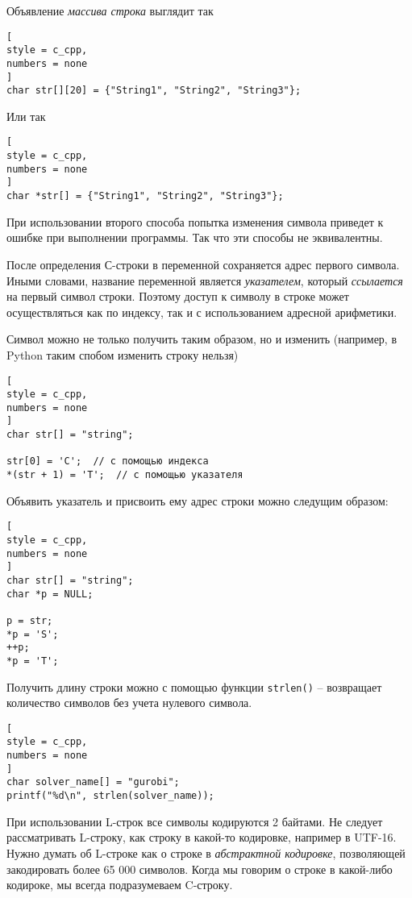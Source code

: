 \documentclass[%
	11pt,
	a4paper,
	utf8,
		]{article}
\begin{document}
Объявление \emph{массива строка} выглядит так
\begin{lstlisting}[
style = c_cpp,
numbers = none
]
char str[][20] = {"String1", "String2", "String3"};
\end{lstlisting}

Или так
\begin{lstlisting}[
style = c_cpp,
numbers = none
]
char *str[] = {"String1", "String2", "String3"};
\end{lstlisting}

При использовании второго способа попытка изменения символа приведет к ошибке при выполнении программы. Так что эти способы не эквивалентны.

После определения С-строки в переменной сохраняется адрес первого символа. Иными словами, название переменной является \emph{указателем}, который \emph{ссылается} на первый символ строки. Поэтому доступ к символу в строке может осуществляться как по индексу, так и с использованием адресной арифметики.

Символ можно не только получить таким образом, но и изменить (например, в Python таким спобом изменить строку нельзя)
\begin{lstlisting}[
style = c_cpp,
numbers = none
]
char str[] = "string";

str[0] = 'C';  // с помощью индекса
*(str + 1) = 'T';  // с помощью указателя
\end{lstlisting}

Объявить указатель и присвоить ему адрес строки можно следущим образом:
\begin{lstlisting}[
style = c_cpp,
numbers = none
]
char str[] = "string";
char *p = NULL;

p = str;
*p = 'S';
++p;
*p = 'T';
\end{lstlisting}

Получить длину строки можно с помощью функции \verb|strlen()| -- возвращает количество символов без учета нулевого символа.
\begin{lstlisting}[
style = c_cpp,
numbers = none
]
char solver_name[] = "gurobi";
printf("%d\n", strlen(solver_name));
\end{lstlisting}

При использовании L-строк все символы кодируются 2 байтами. Не следует рассматривать L-строку, как строку в какой-то кодировке, например в UTF-16. Нужно думать об L-строке как о строке в \emph{абстрактной кодировке}, позволяющей закодировать более 65 000 символов. Когда мы говорим о строке в какой-либо кодироке, мы всегда подразумеваем C-строку.
\end{document}
